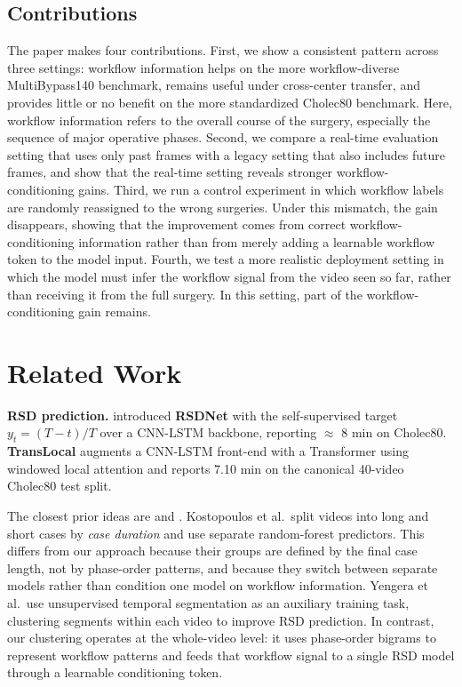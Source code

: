 \subsection{Contributions}\label{our-contributions}
The paper makes four contributions. First, we show a consistent pattern
across three settings: workflow information helps on the more
workflow-diverse MultiBypass140 benchmark, remains useful under
cross-center transfer, and provides little or no benefit on the more
standardized Cholec80 benchmark. Here, workflow information refers to
the overall course of the surgery, especially the sequence of major
operative phases. Second, we compare a real-time evaluation setting that
uses only past frames with a legacy setting that also includes future
frames, and show that the real-time setting reveals stronger
workflow-conditioning gains. Third, we run a control experiment in which
workflow labels are randomly reassigned to the wrong surgeries. Under
this mismatch, the gain disappears, showing that the improvement comes
from correct workflow-conditioning information rather than from merely
adding a learnable workflow token to the model input. Fourth, we test a
more realistic deployment setting in which the model must infer the
workflow signal from the video seen so far, rather than receiving it
from the full surgery. In this setting, part of the
workflow-conditioning gain remains.

\section{Related Work}\label{related-work}

\textbf{RSD prediction.} \citet{twinanda2019rsdnet} introduced
\textbf{RSDNet} with the self-supervised target \(y_t = (T - t) / T\)
over a CNN-LSTM backbone, reporting $\approx$ 8 min on Cholec80.
\textbf{TransLocal} \citep{loukas2024translocal} augments a CNN-LSTM front-end
with a Transformer using windowed local attention and reports 7.10 min
on the canonical 40-video Cholec80 test split.

The closest prior ideas are \textbf{\citet{kostopoulos2025prediction}} and \textbf{\citet{yengera2019unsupervised}}. Kostopoulos et al.~split videos into long and short cases by \emph{case duration} and use separate random-forest predictors. This differs from our approach because their groups are defined by the
final case length, not by phase-order patterns, and because they switch
between separate models rather than condition one model on workflow
information. Yengera et al.~use unsupervised temporal segmentation as an auxiliary
training task, clustering segments within each video to improve RSD
prediction. In contrast, our clustering operates at the whole-video
level: it uses phase-order bigrams to represent workflow patterns and
feeds that workflow signal to a single RSD model through a learnable
conditioning token.

